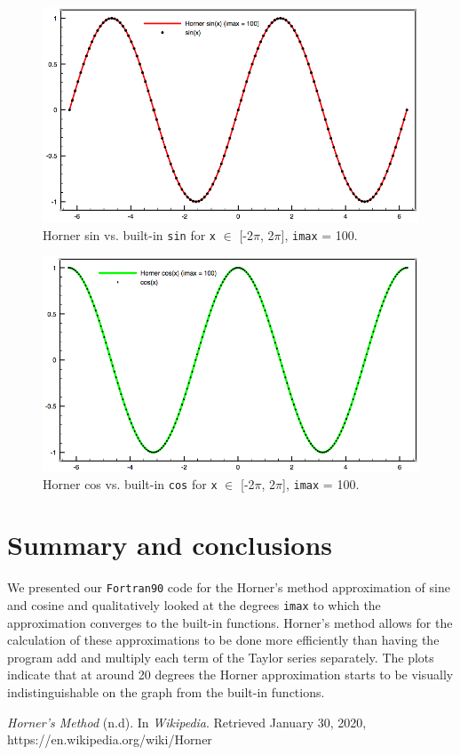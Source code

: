 \documentclass[12pt]{article}
\begin{document}
\begin{figure}[htb!]
\includegraphics[width=1.\textwidth]{fig/sinimax100.png}
\caption{Horner sin vs. built-in {\tt sin} for {\tt x} $\in$ [-2$\pi$, 2$\pi$], {\tt imax} = 100.}
\label{sinimax100}
\end{figure}

\begin{figure}[htb!]
\includegraphics[width=1.\textwidth]{fig/cos.png}
\caption{Horner cos vs. built-in {\tt cos} for {\tt x} $\in$ [-2$\pi$, 2$\pi$], {\tt imax} = 100.}
\label{cos}
\end{figure}

\section{Summary and conclusions}

We presented our {\tt Fortran90} code for the Horner's method approximation of sine and cosine and qualitatively looked at the degrees {\tt imax} to which the approximation converges to the built-in functions. Horner's method allows for the calculation of these approximations to be done more efficiently than having the program add and multiply each term of the Taylor series separately. The plots indicate that at around 20 degrees the Horner approximation starts to be visually indistinguishable on the graph from the built-in functions.

\begin{thebibliography}{}

 {\it Horner's Method} (n.d). In \emph{Wikipedia}. Retrieved January 30, 2020, https://en.wikipedia.org/wiki/Horner%

\end{thebibliography}
\end{document}
